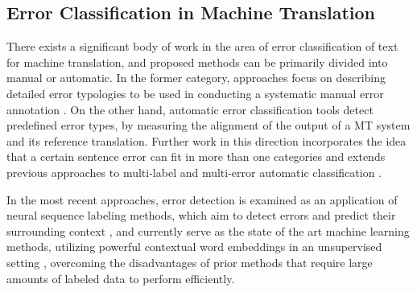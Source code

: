 \subsection{Error Classification in Machine Translation}
\label{ssec:related_errors}


There exists a significant body of work in the area of error classification of text for machine translation, and proposed methods can be primarily divided into manual or automatic. In the former category, approaches focus on describing detailed error typologies to be used in conducting a systematic manual error annotation \cite{fishel2011automatic,vilar2006error, lommel2014multidimensional, farrus2010linguistic, costa2015linguistically}. On the other hand,  automatic error classification tools \cite{zeman2011addicter, popovic2011hjerson,popovic2015poor} detect predefined error types, by measuring the alignment of the output of a MT system and its reference translation. Further work in this direction incorporates the idea that a certain sentence error can fit in more than one categories \cite{klubivcka2018quantitative, lommel2014assessing} and extends previous approaches to multi-label and multi-error automatic classification \citet{popovic2019automatic}. 

In the most recent approaches, error detection is examined as an application of neural sequence labeling methods, which aim to detect errors and predict their surrounding context \cite{rei2017semi}, and currently serve as the state of the art machine learning methods, utilizing powerful contextual word embeddings in an unsupervised setting \cite{bell2019context}, overcoming the disadvantages of prior methods that require large amounts of labeled data to perform efficiently.